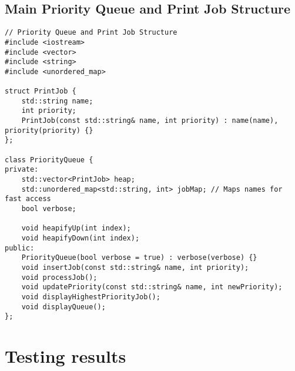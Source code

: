 \documentclass{article}
\begin{document}
\subsection*{Main Priority Queue and Print Job Structure}

\begin{lstlisting}
// Priority Queue and Print Job Structure
#include <iostream>
#include <vector>
#include <string>
#include <unordered_map>

struct PrintJob {
    std::string name;
    int priority;
    PrintJob(const std::string& name, int priority) : name(name), priority(priority) {}
};

class PriorityQueue {
private:
    std::vector<PrintJob> heap;
    std::unordered_map<std::string, int> jobMap; // Maps names for fast access
    bool verbose;

    void heapifyUp(int index);
    void heapifyDown(int index);
public:
    PriorityQueue(bool verbose = true) : verbose(verbose) {}
    void insertJob(const std::string& name, int priority);
    void processJob();
    void updatePriority(const std::string& name, int newPriority);
    void displayHighestPriorityJob();
    void displayQueue();
};
\end{lstlisting}


\section*{Testing results}
\end{document}

